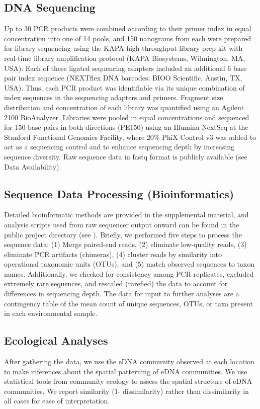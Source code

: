 \documentclass[11pt,letterpaper]{article} %
\begin{document}
\subsection*{DNA Sequencing}
Up to 30 PCR products were combined according to their primer index in equal concentration into one of 14 pools, and 150 nanograms from each were prepared for library sequencing using the KAPA high-throughput library prep kit with real-time library amplification protocol (KAPA Biosystems, Wilmington, MA, USA). Each of these ligated sequencing adapters included an additional 6 base pair index sequence (NEXTflex DNA barcodes; BIOO Scientific, Austin, TX, USA). Thus, each PCR product was identifiable via its unique combination of index sequences in the sequencing adapters and primers. Fragment size distribution and concentration of each library was quantified using an Agilent 2100 BioAnalyzer. Libraries were pooled in equal concentrations and sequenced for 150 base pairs in both directions (PE150) using an Illumina NextSeq at the Stanford Functional Genomics Facility, where 20\% PhiX Control v3 was added to act as a sequencing control and to enhance sequencing depth by increasing sequence diversity. Raw sequence data in fastq format is publicly available (see Data Availability).


\subsection*{Sequence Data Processing (Bioinformatics)}
Detailed bioinformatic methods are provided in the supplemental material, and analysis scripts used from raw sequencer output onward can be found in the public project directory (see ). Briefly, we performed five steps to process the sequence data: (1) Merge paired-end reads, (2) eliminate low-quality reads, (3) eliminate PCR artifacts (chimeras), (4) cluster reads by similarity into operational taxonomic units (OTUs), and (5) match observed sequences to taxon names. Additionally, we checked for consistency among PCR replicates, excluded extremely rare sequences, and rescaled (rarefied) the data to account for differences in sequencing depth. The data for input to further analyses are a contingency table of the mean count of unique sequences, OTUs, or taxa present in each environmental sample.


\subsection*{Ecological Analyses}
After gathering the data, we use the eDNA community observed at each location to make inferences about the spatial patterning of eDNA communities. We use statistical tools from community ecology to assess the spatial structure of eDNA communities. We report similarity (1- dissimilarity) rather than dissimilarity in all cases for ease of interpretation.
\end{document}
